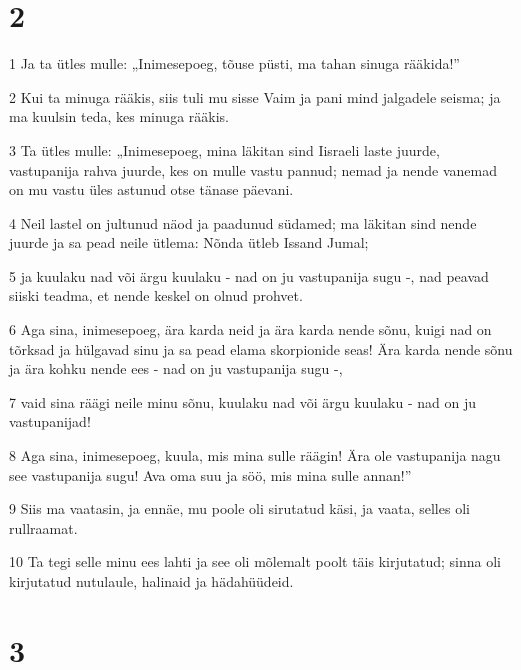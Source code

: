 \chapter{2}

\par 1 Ja ta ütles mulle: „Inimesepoeg, tõuse püsti, ma tahan sinuga rääkida!”
\par 2 Kui ta minuga rääkis, siis tuli mu sisse Vaim ja pani mind jalgadele seisma; ja ma kuulsin teda, kes minuga rääkis.
\par 3 Ta ütles mulle: „Inimesepoeg, mina läkitan sind Iisraeli laste juurde, vastupanija rahva juurde, kes on mulle vastu pannud; nemad ja nende vanemad on mu vastu üles astunud otse tänase päevani.
\par 4 Neil lastel on jultunud näod ja paadunud südamed; ma läkitan sind nende juurde ja sa pead neile ütlema: Nõnda ütleb Issand Jumal;
\par 5 ja kuulaku nad või ärgu kuulaku - nad on ju vastupanija sugu -, nad peavad siiski teadma, et nende keskel on olnud prohvet.
\par 6 Aga sina, inimesepoeg, ära karda neid ja ära karda nende sõnu, kuigi nad on tõrksad ja hülgavad sinu ja sa pead elama skorpionide seas! Ära karda nende sõnu ja ära kohku nende ees - nad on ju vastupanija sugu -,
\par 7 vaid sina räägi neile minu sõnu, kuulaku nad või ärgu kuulaku - nad on ju vastupanijad!
\par 8 Aga sina, inimesepoeg, kuula, mis mina sulle räägin! Ära ole vastupanija nagu see vastupanija sugu! Ava oma suu ja söö, mis mina sulle annan!”
\par 9 Siis ma vaatasin, ja ennäe, mu poole oli sirutatud käsi, ja vaata, selles oli rullraamat.
\par 10 Ta tegi selle minu ees lahti ja see oli mõlemalt poolt täis kirjutatud; sinna oli kirjutatud nutulaule, halinaid ja hädahüüdeid.

\chapter{3}

